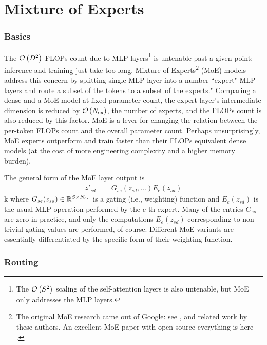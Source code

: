 \part{Mixture of Experts}

\section{Basics}

The $ \mathcal{O} \left(  D ^{ 2 } \right)  $ FLOPs count due to MLP layers\footnote{The $ \mathcal{O} \left( S
^{ 2 } \right)  $ scaling of the self-attention layers is also untenable, but MoE only addresses the
MLP layers.} is untenable past a given point: inference and training just take too long.  Mixture of
Experts\footnote{The original MoE research came out of Google: see
    \cite{fedus2022switchtransformersscalingtrillion},
    \cite{shazeer2017outrageouslylargeneuralnetworks} and related work by these authors. An
excellent MoE paper with open-source everything is here
\cite{muennighoff2024olmoeopenmixtureofexpertslanguage}. } (MoE) models address this concern by
splitting single MLP layer into a number ``expert" MLP layers and route a subset of the tokens to a
subset of the experts."  Comparing a dense and a MoE model at fixed parameter count, the expert
layer's intermediate dimension is reduced by $ \mathcal{O} \left( N _{ {\rm ex} } \right)  $, the number
of experts, and the FLOPs count is also reduced by this factor. MoE is a lever for changing the
relation between the per-token FLOPs count and the overall parameter count. Perhaps unsurprisingly,
MoE experts outperform and train faster than their FLOPs equivalent dense models (at the cost of
more engineering complexity and a higher memory burden).

The general form of the MoE layer output is
\begin{align}
    z' _{ sd } &=G _{ se }(z _{ sd }, \ldots )E _{ e } \left ( z _{ sd } \right )
\end{align}k
where $ G _{ se }(z _{ sd }) \in \mathbb{R} ^{ S \times N _{ {\rm ex}  } } $ is a gating (i.e.,
weighting) function and $ E _{ e } \left ( z _{ sd } \right ) $ is the usual MLP operation performed
by the $ e $-th expert. Many of the entries $ G _{ es } $  are zero in practice, and only the
computations $ E _{ e } \left ( z _{ sd } \right ) $ corresponding to non-trivial gating values are
performed, of course. Different MoE variants are essentially differentiated by the specific form of
their weighting function.


\section{Routing}


